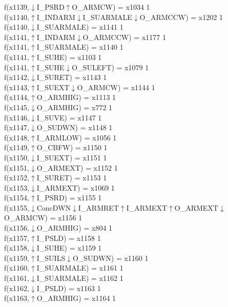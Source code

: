 f(x1139,$\downarrow$I\_PSRD$\uparrow$O\_ARMCW) = x1034 {1} \\
f(x1140,$\uparrow$I\_INDARM$\downarrow$I\_SUARMALE$\downarrow$O\_ARMCCW) = x1202 {1} \\
f(x1140,$\downarrow$I\_SUARMALE) = x1141 {1} \\
f(x1141,$\uparrow$I\_INDARM$\downarrow$O\_ARMCCW) = x1177 {1} \\
f(x1141,$\uparrow$I\_SUARMALE) = x1140 {1} \\
f(x1141,$\uparrow$I\_SUHE) = x1103 {1} \\
f(x1141,$\uparrow$I\_SUHE$\downarrow$O\_SULEFT) = x1079 {1} \\
f(x1142,$\downarrow$I\_SURET) = x1143 {1} \\
f(x1143,$\uparrow$I\_SUEXT$\downarrow$O\_ARMCW) = x1144 {1} \\
f(x1144,$\uparrow$O\_ARMHIG) = x1113 {1} \\
f(x1145,$\downarrow$O\_ARMHIG) = x772 {1} \\
f(x1146,$\downarrow$I\_SUVE) = x1147 {1} \\
f(x1147,$\downarrow$O\_SUDWN) = x1148 {1} \\
f(x1148,$\uparrow$I\_ARMLOW) = x1056 {1} \\
f(x1149,$\uparrow$O\_CBFW) = x1150 {1} \\
f(x1150,$\downarrow$I\_SUEXT) = x1151 {1} \\
f(x1151,$\downarrow$O\_ARMEXT) = x1152 {1} \\
f(x1152,$\uparrow$I\_SURET) = x1153 {1} \\
f(x1153,$\downarrow$I\_ARMEXT) = x1069 {1} \\
f(x1154,$\uparrow$I\_PSRD) = x1155 {1} \\
f(x1155,$\downarrow$ConcDWN$\downarrow$I\_ARMRET$\uparrow$I\_ARMEXT$\uparrow$O\_ARMEXT$\downarrow$O\_ARMCW) = x1156 {1} \\
f(x1156,$\downarrow$O\_ARMHIG) = x804 {1} \\
f(x1157,$\uparrow$I\_PSLD) = x1158 {1} \\
f(x1158,$\downarrow$I\_SUHE) = x1159 {1} \\
f(x1159,$\uparrow$I\_SUILS$\downarrow$O\_SUDWN) = x1160 {1} \\
f(x1160,$\uparrow$I\_SUARMALE) = x1161 {1} \\
f(x1161,$\downarrow$I\_SUARMALE) = x1162 {1} \\
f(x1162,$\downarrow$I\_PSLD) = x1163 {1} \\
f(x1163,$\uparrow$O\_ARMHIG) = x1164 {1} \\
